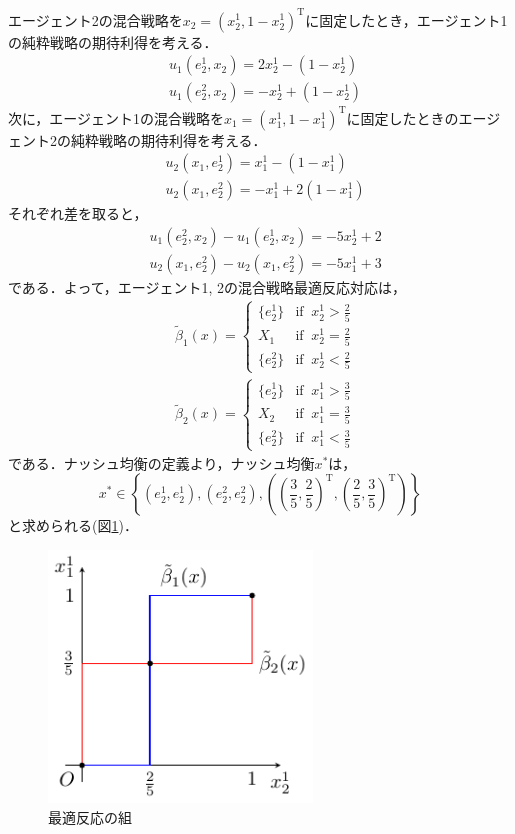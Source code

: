 \documentclass{jsreport}
\begin{document}
エージェント2の混合戦略を$x_2 = (x_2^1, 1 - x_2^1)^{\mathrm{T}}$に固定したとき，エージェント1の純粋戦略の期待利得を考える．
\begin{align}
  &u_1(e_2^1, x_2) = 2x_2^1 - (1 - x_2^1) \nonumber \\
  &u_1(e_2^2, x_2) = -x_2^1 + (1 - x_2^1) \nonumber
\end{align}
次に，エージェント1の混合戦略を$x_1 = (x_1^1, 1 - x_1^1)^{\mathrm{T}}$に固定したときのエージェント2の純粋戦略の期待利得を考える．
\begin{align}
  &u_2(x_1, e_2^1) = x_1^1 - (1 - x_1^1) \nonumber \\
  &u_2(x_1, e_2^2) = -x_1^1 + 2(1 - x_1^1) \nonumber
\end{align}
それぞれ差を取ると，
\begin{align}
  &u_1(e_2^2, x_2) - u_1(e_2^1, x_2) = -5x_2^1 + 2 \nonumber \\
  &u_2(x_1, e_2^2) - u_2(x_1, e_2^2) = -5x_1^1 + 3 \nonumber
\end{align}
である．よって，エージェント1, 2の混合戦略最適反応対応は，
\begin{align}
  &\tilde{\beta}_1(x) = \begin{cases}
    \{e_2^1\} & \mbox{if} \; \; x_2^1 > \frac{2}{5} \\
    X_1 & \mbox{if} \; \; x_2^1 = \frac{2}{5} \\
    \{e_2^2\} & \mbox{if} \; \; x_2^1 < \frac{2}{5}
\end{cases} \nonumber \\
&\tilde{\beta}_2(x) = \begin{cases}
  \{e_2^1\} & \mbox{if} \; \; x_1^1 > \frac{3}{5} \\
  X_2 & \mbox{if} \; \; x_1^1 = \frac{3}{5} \\
  \{e_2^2\} & \mbox{if} \; \; x_1^1 < \frac{3}{5}
\end{cases} \nonumber
\end{align}
である．ナッシュ均衡の定義より，ナッシュ均衡$x^{*}$は，
\begin{equation}
  x^{*} \in \left\{(e_2^1, e_2^1), (e_2^2, e_2^2), \left(\left(\frac{3}{5}, \frac{2}{5}\right)^{\mathrm{T}}, \left(\frac{2}{5}, \frac{3}{5}\right)^{\mathrm{T}}\right)\right\} \nonumber
\end{equation}
と求められる(図\ref{fig:nash2})．

\begin{figure}[tb]
  \centering
  \includegraphics[clip, width=7cm]{./fig/nash_2_1.pdf}
  \caption{最適反応の組}
  \label{fig:nash2}
\end{figure}
\end{document}
